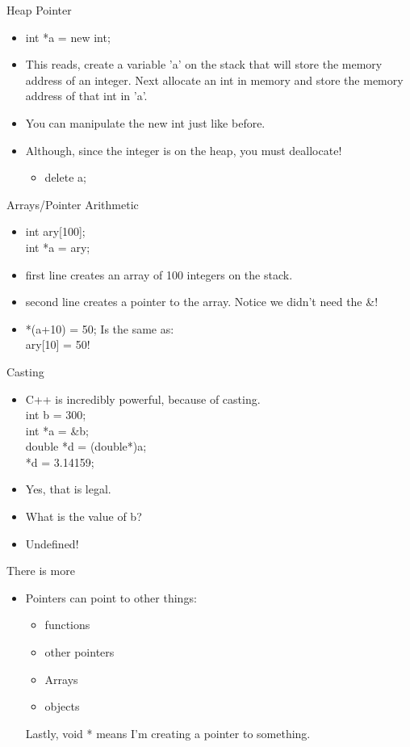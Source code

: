 \documentclass{beamer}
\begin{document}
\begin{frame}{Heap Pointer}
\begin{itemize}
\item int *a = new int;
\item This reads, create a variable 'a' on the stack that will store the memory address of an integer.  Next allocate an int in memory and store the memory address of that int in 'a'.
\item You can manipulate the new int just like before.
\item Although, since the integer is on the heap, you must deallocate!
\begin{itemize}
\item delete a;
\end{itemize}
\end{itemize}
\end{frame}

\begin{frame}{Arrays/Pointer Arithmetic}
\begin{itemize}
\item int ary[100];\\
int *a = ary;
\item first line creates an array of 100 integers on the stack.
\item second line creates a pointer to the array.  Notice we didn't need the \&!
\item *(a+10) = 50; Is the same as:\\
ary[10] = 50!
\end{itemize}
\end{frame}

\begin{frame}{Casting}
\begin{itemize}
\item C++ is incredibly powerful, because of casting.\\
int b = 300; \\
int *a = \&b; \\
double *d = (double*)a; \\
*d = 3.14159;
\item Yes, that is legal. 
\item What is the value of b?
\item <2-> Undefined!
\end{itemize}
\end{frame}

\begin{frame}{There is more}
\begin{itemize}
\item Pointers can point to other things:
\begin{itemize}
\item functions
\item other pointers
\item Arrays
\item objects
\end{itemize}
Lastly, void * means I'm creating a pointer to something.
\end{itemize}
\end{frame}
\end{document}
